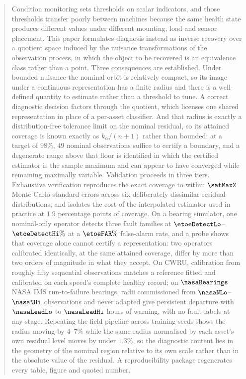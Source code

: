 \begin{abstract}
Condition monitoring sets thresholds on scalar indicators, and those
thresholds transfer poorly between machines because the same health state
produces different values under different mounting, load and sensor placement.
This paper formulates diagnosis instead as inverse recovery over a quotient
space induced by the nuisance transformations of the observation process, in
which the object to be recovered is an equivalence class rather than a point.
Three consequences are established. Under bounded nuisance the nominal orbit
is relatively compact, so its image under a continuous representation has a
finite radius and there is a well-defined quantity to estimate rather than a
threshold to tune. A correct diagnostic decision factors through the quotient,
which licenses one shared representation in place of a per-asset classifier.
And that radius is exactly a distribution-free tolerance limit on the nominal
residual, so its attained coverage is known exactly as \(k_\alpha/(n+1)\)
rather than bounded: at a target of \(98\%\), \(49\) nominal observations
suffice to certify a boundary, and a degenerate range above that floor is
identified in which the certified estimator is the sample maximum and can
appear to have converged while remaining maximally variable. Validation
proceeds in three tiers. Exhaustive verification reproduces the exact coverage
to within \(\satMaxZ\) Monte Carlo standard errors across six deliberately
dissimilar residual distributions, and isolates the cost of the interpolated
estimator used in practice at \(1.9\) percentage points of coverage. On a
bearing simulator, one nominal-only operator detects three fault families at
\(\etoeDetectLo\)--\(\etoeDetectHi\%\) at a \(\etoeFAR\%\)
false-alarm rate, and a probe shows that coverage alone cannot certify a
representation: two operators calibrated identically, at the same attained
coverage, differ by more than two orders of magnitude in what they accept. On
CWRU, calibration from roughly fifty sequential observations matches a
reference fitted and calibrated on each speed's complete healthy record; on
\(\nasaBearings\) NASA IMS run-to-failure bearings, radii commissioned from
\(\nasaNLo\)--\(\nasaNHi\) observations and never adapted give persistent
departure with \(\nasaLeadLo\) to \(\nasaLeadHi\) hours of warning, with
no fault labels at any stage. Repeating the field pipeline across training
seeds shows the radius moving by \(4\)--\(7\%\) while the same radius
normalised by each asset's own residual level moves by under \(1.3\%\), so
the diagnostic content lies in the geometry of the nominal region relative to
its own scale rather than in the absolute value of the residual. A
reproducibility package regenerates every table, figure and quoted number.

\end{abstract}

